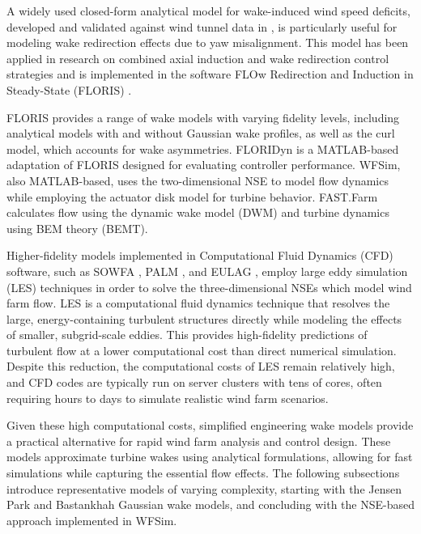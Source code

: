 %
A widely used closed-form analytical model for wake-induced wind speed deficits, developed and validated against wind tunnel data in \cite{bastankhah2016experimental}, is particularly useful for modeling wake redirection effects due to yaw misalignment. This model has been applied in research on combined axial induction and wake redirection control strategies \cite{boersma2019constrained} and is implemented in the software FLOw Redirection and Induction in Steady-State (FLORIS) \cite{fleming2021experimental}.

FLORIS provides a range of wake models with varying fidelity levels, including analytical models with and without Gaussian wake profiles, as well as the curl model, which accounts for wake asymmetries. FLORIDyn \cite{becker2022FLORIDyn} is a MATLAB-based adaptation of FLORIS designed for evaluating controller performance. WFSim, also MATLAB-based, uses the two-dimensional NSE to model flow dynamics while employing the actuator disk model for turbine behavior. FAST.Farm \cite{jonkman2017development} calculates flow using the dynamic wake model (DWM) and turbine dynamics using BEM theory (BEMT).

Higher-fidelity models implemented in Computational Fluid Dynamics (CFD) software, such as SOWFA \cite{fleming2014evaluating}, PALM \cite{maronga2015parallelized}, and EULAG \cite{prusa2008eulag}, employ large eddy simulation (LES) techniques in order to solve the three-dimensional NSEs which model wind farm flow. LES is a computational fluid dynamics technique that resolves the large, energy-containing turbulent structures directly while modeling the effects of smaller, subgrid-scale eddies. This provides high-fidelity predictions of turbulent flow at a lower computational cost than direct numerical simulation. Despite this reduction, the computational costs of LES remain relatively high, and CFD codes are typically run on server clusters with tens of cores, often requiring hours to days to simulate realistic wind farm scenarios.

Given these high computational costs, simplified engineering wake models provide a practical alternative for rapid wind farm analysis and control design. These models approximate turbine wakes using analytical formulations, allowing for fast simulations while capturing the essential flow effects. The following subsections introduce representative models of varying complexity, starting with the Jensen Park and Bastankhah Gaussian wake models, and concluding with the NSE-based approach implemented in WFSim.

